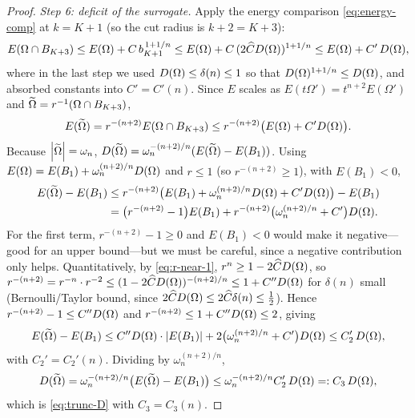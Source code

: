 \begin{proof}
\smallskip
\emph{Step 6: deficit of the surrogate.}
Apply the energy comparison \eqref{eq:energy-comp} at $k=K+1$ (so the
cut radius is $k+2=K+3$):
\[
   E(\Omega\cap B_{K+3})\le E(\Omega)+C\,b_{K+1}^{\,1+1/n}
   \le E(\Omega)+C\,(2\widehat C D(\Omega))^{1+1/n}
   \le E(\Omega)+C'\,D(\Omega),
\]
where in the last step we used $D(\Omega)\le\delta(n)\le1$ so that
$D(\Omega)^{1+1/n}\le D(\Omega)$, and absorbed constants into
$C'=C'(n)$. Since $E$ scales as
$E(t\Omega')=t^{n+2}E(\Omega')$ and $\widetilde{\Omega}=r^{-1}(\Omega\cap B_{K+3})$,
\[
   E(\widetilde{\Omega})=r^{-(n+2)}E(\Omega\cap B_{K+3})
   \le r^{-(n+2)}\bigl(E(\Omega)+C'D(\Omega)\bigr).
\]
Because $\left|\widetilde{\Omega}\right|=\omega_n$,
$D(\widetilde{\Omega})=\omega_n^{-(n+2)/n}(E(\widetilde{\Omega})-E(B_1))$. Using
$E(\Omega)=E(B_1)+\omega_n^{(n+2)/n}D(\Omega)$ and $r\le1$ (so
$r^{-(n+2)}\ge1$), with $E(B_1)<0$,
\begin{align*}
   E(\widetilde{\Omega})-E(B_1)
   &\le r^{-(n+2)}\bigl(E(B_1)+\omega_n^{(n+2)/n}D(\Omega)+C'D(\Omega)\bigr)-E(B_1)\\
   &=\bigl(r^{-(n+2)}-1\bigr)E(B_1)
     +r^{-(n+2)}\bigl(\omega_n^{(n+2)/n}+C'\bigr)D(\Omega).
\end{align*}
For the first term, $r^{-(n+2)}-1\ge0$ and $E(B_1)<0$ would make it
negative—good for an upper bound—but we must be careful, since a negative
contribution only helps. Quantitatively, by \eqref{eq:r-near-1},
$r^{n}\ge1-2\widehat C D(\Omega)$, so
$r^{-(n+2)}=r^{-n}\cdot r^{-2}\le(1-2\widehat C D(\Omega))^{-(n+2)/n}
\le1+C''D(\Omega)$ for $\delta(n)$ small (Bernoulli/Taylor bound, since
$2\widehat C D(\Omega)\le2\widehat C\delta(n)\le\tfrac12$). Hence
$r^{-(n+2)}-1\le C''D(\Omega)$ and $r^{-(n+2)}\le1+C''D(\Omega)\le2$, giving
\[
   E(\widetilde{\Omega})-E(B_1)
   \le C''D(\Omega)\cdot\left|E(B_1)\right|+2\bigl(\omega_n^{(n+2)/n}+C'\bigr)D(\Omega)
   \le C_2'\,D(\Omega),
\]
with $C_2'=C_2'(n)$. Dividing by $\omega_n^{(n+2)/n}$,
\begin{equation}\label{eq:D-tilde}
   D(\widetilde{\Omega})=\omega_n^{-(n+2)/n}\bigl(E(\widetilde{\Omega})-E(B_1)\bigr)
   \le\omega_n^{-(n+2)/n}C_2'\,D(\Omega)=:C_3\,D(\Omega),
\end{equation}
which is \eqref{eq:trunc-D} with $C_3=C_3(n)$.


\end{proof}
